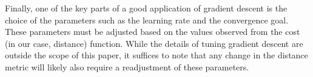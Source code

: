 Finally, one of the key parts of a good application of gradient descent is the choice of the parameters such as the learning rate and the convergence goal.
These parameters must be adjusted based on the values observed from the cost (in our case, distance) function.
While the details of tuning gradient descent are outside the scope of this paper, it suffices to note that any change in the distance metric will likely also require a readjustment of these parameters.


